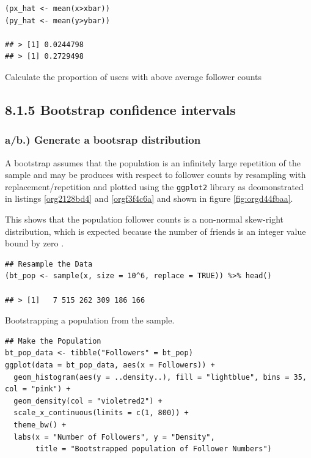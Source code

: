 \documentclass[11pt]{article}
\begin{document}
\begin{listing}[htbp]
\begin{verbatim}
(px_hat <- mean(x>xbar))
(py_hat <- mean(y>ybar))

## > [1] 0.0244798
## > [1] 0.2729498
\end{verbatim}
\caption{\label{orgf109f9a}Calculate the proportion of users with above average follower counts}
\end{listing}


\subsection{8.1.5 Bootstrap confidence intervals}
\label{sec:org4004777}
\subsubsection{a/b.) Generate a bootsrap distribution}
\label{sec:org72f97e9}

A bootstrap assumes that the population is an infinitely large repetition of the
sample and may be produces with respect to follower counts by resampling with
replacement/repetition and plotted using the \texttt{ggplot2} library as deomonstrated
in listings \ref{org2128bd4} and \ref{orgf3f4c6a} and shown in figure \ref{fig:orgd44fbaa}.

This shows that the population follower counts is a non-normal skew-right
distribution, which is expected because the number of friends is an integer value bound by zero \cite{nist2013}.

\begin{listing}[htbp]
\begin{verbatim}
## Resample the Data
(bt_pop <- sample(x, size = 10^6, replace = TRUE)) %>% head()

## > [1]   7 515 262 309 186 166
\end{verbatim}
\caption{\label{org2128bd4}Bootstrapping a population from the sample.}
\end{listing}

\begin{listing}[htbp]
\begin{verbatim}
## Make the Population
bt_pop_data <- tibble("Followers" = bt_pop)
ggplot(data = bt_pop_data, aes(x = Followers)) +
  geom_histogram(aes(y = ..density..), fill = "lightblue", bins = 35, col = "pink") +
  geom_density(col = "violetred2") +
  scale_x_continuous(limits = c(1, 800)) +
  theme_bw() +
  labs(x = "Number of Followers", y = "Density",
       title = "Bootstrapped population of Follower Numbers")

\end{verbatim}
\label{orgf3f4c6a}
\end{listing}
\end{document}
